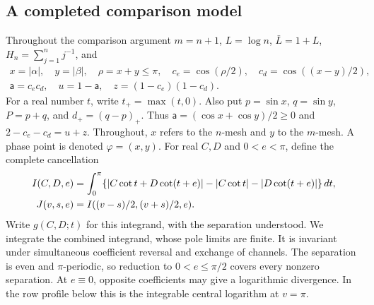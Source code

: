 \subsection{A completed comparison model}
\label{uc:model}

Throughout the comparison argument $m=n+1$, $L=\log n$, $\bar{L}=1+L$,
$H_n=\sum_{j=1}^n j^{-1}$, and
\[
 \begin{gathered}
 x=|\alpha|,\quad y=|\beta|,\quad \rho=x+y\leq\pi,\quad
 c_e=\cos(\rho/2),\quad c_d=\cos((x-y)/2),\\
 \mathsf{a}=c_ec_d,\quad u=1-\mathsf{a},\quad z=(1-c_e)(1-c_d).
 \end{gathered}
\]
For a real number $t$, write $t_+=\max(t,0)$.
Also put $p=\sin x$, $q=\sin y$, $P=p+q$, and $d_+=(q-p)_+$.
Thus $\mathsf{a}=(\cos x+\cos y)/2\geq0$ and $2-c_e-c_d=u+z$.
Throughout, $x$ refers to the $n$-mesh and $y$ to the $m$-mesh.
A phase point is denoted $\varphi=(x,y)$.
For real $C,D$ and $0<e<\pi$, define the complete cancellation
\begin{align}\label{uc:cancellation}
 I(C,D,e)&=\int_0^\pi
 \{|C\cot t+D\cot(t+e)|-|C\cot t|-|D\cot(t+e)|\}\,dt,\notag\\
 J(v,s,e)&=I((v-s)/2,(v+s)/2,e).
\end{align}
Write $g(C,D;t)$ for this integrand, with the separation understood.
We integrate the combined integrand, whose pole limits are finite.
It is invariant under simultaneous coefficient reversal and exchange of
channels. The separation is even and $\pi$-periodic, so reduction to
$0<e\leq\pi/2$ covers every nonzero separation. At $e\equiv0$,
opposite coefficients may give a logarithmic divergence. In the row
profile below this is the integrable central logarithm at $v=\pi$.

